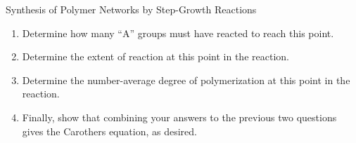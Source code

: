\begin{activity}[extension]{Synthesis of Polymer Networks by Step-Growth Reactions}
\begin{exercises}
\begin{enumerate}
			\item Determine how many ``A'' groups must have reacted to reach this point.
			
				\begin{solution}\end{solution}
				
			\item Determine the extent of reaction at this point in the reaction.
			
				\begin{solution}\end{solution}
				
			\item Determine the number-average degree of polymerization at this point in the reaction.
			
				\begin{solution}\end{solution}
				
			\item Finally, show that combining your answers to the previous two questions gives the Carothers equation, as desired.
			
				\begin{solution}\end{solution}
		\end{enumerate}
	
\end{exercises}


%
%	


	
\end{activity}